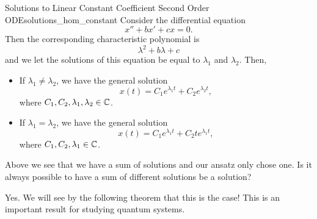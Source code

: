         \begin{prop}{Solutions to Linear Constant Coefficient Second Order ODE}{solutions_hom_constant}
        Consider the differential equation
        \[
        x''+bx'+cx=0.
        \]
        Then the corresponding characteristic polynomial is
        \[
        \lambda^2+b\lambda +c
        \]
        and we let the solutions of this equation be equal to $\lambda_1$ and $\lambda_2$. Then, 
        \begin{itemize}
                \item If $\lambda_1 \neq \lambda_2$, we have the general solution
        \[
        x(t)=C_1 e^{\lambda_1t}+C_2e^{\lambda_2t},
        \]
        where $C_1,C_2,\lambda_1,\lambda_2 \in \mathbb{C}$.
            \item If $\lambda_1=\lambda_2$, we have the general solution
        \[
            x(t) = C_1 e^{\lambda_1 t} + C_2 t e^{\lambda_1 t},
        \]
        where $C_1, C_2, \lambda_1 \in \mathbb{C}$.
        \end{itemize}
        \end{prop}
        
        \begin{question}
        Above we see that we have a sum of solutions and our ansatz only chose one. Is it always possible to have a sum of different solutions be a solution?
        \end{question}
        
        \begin{answer}
        Yes. We will see by the following theorem that this is the case! This is an important result for studying quantum systems.
        \end{answer}
        
